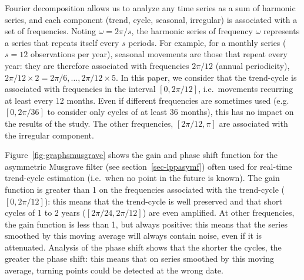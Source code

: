 \documentclass[
]{article}
\newcommand\1{\mathds{1}}
\begin{document}
Fourier decomposition allows us to analyze any time series as a sum of
harmonic series, and each component (trend, cycle, seasonal, irregular)
is associated with a set of frequencies. Noting \(\omega = 2\pi/s\), the
harmonic series of frequency \(\omega\) represents a series that repeats
itself every \(s\) periods. For example, for a monthly series (\(s=12\)
observations per year), seasonal movements are those that repeat every
year: they are therefore associated with frequencies \(2\pi/12\) (annual
periodicity), \(2\pi/12\times 2=2\pi/6,\dots,2\pi/12\times 5\). In this
paper, we consider that the trend-cycle is associated with frequencies
in the interval \([0, 2\pi/12]\), i.e.~movements recurring at least
every 12 months. Even if different frequencies are sometimes used
(e.g.~\([0, 2\pi/36]\) to consider only cycles of at least 36 months),
this has no impact on the results of the study. The other frequencies,
\([2\pi/12, \pi]\) are associated with the irregular component.

Figure~\ref{fig-graphsmusgrave} shows the gain and phase shift function
for the asymmetric Musgrave filter (see section~\ref{sec-lppasymf})
often used for real-time trend-cycle estimation (i.e.~when no point in
the future is known). The gain function is greater than 1 on the
frequencies associated with the trend-cycle (\([0, 2\pi/12]\)): this
means that the trend-cycle is well preserved and that short cycles of 1
to 2 years (\([2\pi/24,2\pi/12]\)) are even amplified. At other
frequencies, the gain function is less than 1, but always positive: this
means that the series smoothed by this moving average will always
contain noise, even if it is attenuated. Analysis of the phase shift
shows that the shorter the cycles, the greater the phase shift: this
means that on series smoothed by this moving average, turning points
could be detected at the wrong date.
\end{document}
